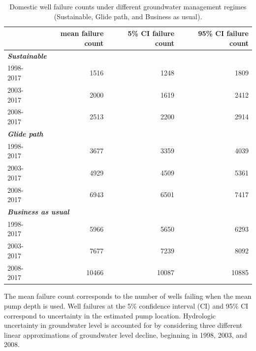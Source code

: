 \begin{table}[H]
	\centering\footnotesize
	\caption{Domestic well failure counts under different groundwater management regimes (Sustainable, Glide path, and Business as usual).}
	\begin{threeparttable}
		
		\begin{tabular}{lrrr}
			
			\hline
			\hline
			
			& \textbf{mean failure count} & \textbf{5\% CI failure count} & \textbf{95\% CI failure count} \\
			
			\hline
			
			\multicolumn{4}{l}{\textbf{\textit{Sustainable}}}\\
			\hspace{1em}1998-2017 & 1516 & 1248 & 1809\\
			\hspace{1em}2003-2017 & 2000 & 1619 & 2412\\
			\hspace{1em}2008-2017 & 2513 & 2200 & 2914\\
			
			\hline
			\multicolumn{4}{l}{\textbf{\textit{Glide path}}}\\
			\hspace{1em}1998-2017 & 3677 & 3359 & 4039\\
			\hspace{1em}2003-2017 & 4929 & 4509 & 5361\\
			\hspace{1em}2008-2017 & 6943 & 6501 & 7417\\
			
			\hline
			\multicolumn{4}{l}{\textbf{\textit{Business as usual}}}\\
			\hspace{1em}1998-2017 & 5966 & 5650 & 6293\\
			\hspace{1em}2003-2017 & 7677 & 7239 & 8092\\
			\hspace{1em}2008-2017 & 10466 & 10087 & 10885\\
			\hline
			
		\end{tabular}
		\label{tab:dom_failures}
		\begin{tablenotes} 
			The mean failure count corresponds to the number of wells failing when the mean pump depth is used. Well failures at the 5\% confidence interval (CI) and 95\% CI correspond to uncertainty in the estimated pump location. Hydrologic uncertainty in groundwater level is accounted for by considering three different linear approximations of groundwater level decline, beginning in 1998, 2003, and 2008.
		\end{tablenotes}
	\end{threeparttable}
\end{table}

